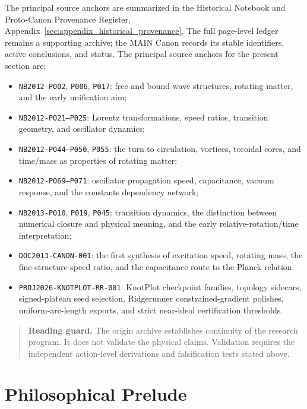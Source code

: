 \documentclass[11pt]{article}
\theoremstyle{definition}
\theoremstyle{plain}
\theoremstyle{remark}
\begin{document}
The principal source anchors are summarized in the Historical Notebook and
Proto-Canon Provenance Register, Appendix~\ref{sec:appendix_historical_provenance}.
The full page-level ledger remains a supporting archive; the MAIN Canon records
its stable identifiers, active conclusions, and status. The principal source
anchors for the present section are:
\begin{itemize}
    \item \texttt{NB2012-P002}, \texttt{P006}, \texttt{P017}: free and bound
    wave structures, rotating matter, and the early unification aim;
    \item \texttt{NB2012-P021--P025}: Lorentz transformations, speed ratios,
    transition geometry, and oscillator dynamics;
    \item \texttt{NB2012-P044--P050}, \texttt{P055}: the turn to circulation,
    vortices, toroidal cores, and time/mass as properties of rotating matter;
    \item \texttt{NB2012-P069--P071}: oscillator propagation speed,
    capacitance, vacuum response, and the constants dependency network;
    \item \texttt{NB2013-P010}, \texttt{P019}, \texttt{P045}: transition
    dynamics, the distinction between numerical closure and physical meaning,
    and the early relative-rotation/time interpretation;
    \item \texttt{DOC2013-CANON-001}: the first synthesis of excitation speed,
    rotating mass, the fine-structure speed ratio, and the capacitance route to
    the Planck relation.
    \item \texttt{PROJ2026-KNOTPLOT-RR-001}: KnotPlot checkpoint
    families, topology sidecars, signed-plateau seed selection, Ridgerunner
    constrained-gradient polishes, uniform-arc-length exports, and strict
    near-ideal certification thresholds.
\end{itemize}

\begin{quote}
\small
\textbf{Reading guard.}
The origin archive establishes continuity of the research program. It does not
validate the physical claims. Validation requires the independent action-level
derivations and falsification tests stated above.
\end{quote}



    \section{Philosophical Prelude}
        \label{sec:philosophy}
\end{document}
